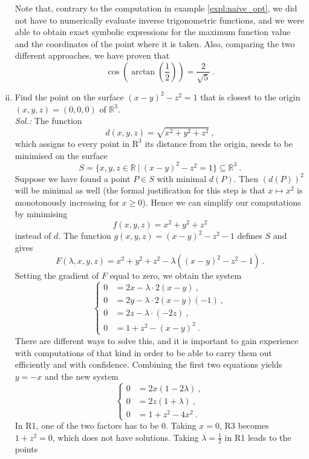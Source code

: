 \begin{example}
\begin{enumerate}[(i)]
	Note that, contrary to the computation in example \ref{expl:naive_opt}, we did not have to numerically evaluate inverse trigonometric functions, and we were able to obtain exact symbolic expressions for the maximum function value and the coordinates of the point where it is taken. Also, comparing the two different approaches, we have proven that
	\[ \cos \left( \arctan \left( \frac{1}{2}\right)\right) = \frac{2}{\sqrt{5}} \:. \]
	\item Find the point on the surface $(x-y)^2-z^2 = 1$ that is closest to the origin $(x,y,z)=(0,0,0)$ of $\mathbb{R}^3$.\\
	{\it Sol.:}
	The function
	\[ d(x,y,z) = \sqrt{x^2+y^2+z^2} \:, \]
	which assigns to every point in $\mathrm{R}^3$ its distance from the origin, needs to be minimised on the surface
	\[ S = \{ x,y,z\in \mathbb{R} \: | \: (x-y)^2-z^2 = 1\} \subseteq \mathbb{R}^3 \:. \]
	Suppose we have found a point $P \in S$ with minimal $d(P)$. Then $(d(P))^2$ will be minimal as well (the formal justification for this step is that $x \mapsto x^2$ is monotonously increasing for $x \geq 0$). Hence we can simplify our computations by minimising 
	\[ f(x,y,z) = x^2+y^2+z^2 \]
	instead of $d$. The function $g(x,y,z)=(x-y)^2-z^2-1$ defines $S$ and gives
	\[ F(\lambda,x,y,z) = x^2+y^2+z^2-\lambda((x-y)^2-z^2-1) \:. \]
	Setting the gradient of $F$ equal to zero, we obtain the system
	\begin{equation*}
		\begin{cases}
			0 &= 2x - \lambda \cdot 2(x-y) \:, \\
			0 &= 2y - \lambda \cdot 2(x-y)(-1) \:, \\
			0 &= 2z - \lambda \cdot (-2z) \:, \\
			0 &= 1+z^2-(x-y)^2 \:.
		\end{cases}
	\end{equation*}
	There are different ways to solve this, and it is important to gain experience with computations of that kind in order to be able to carry them out efficiently and with confidence. Combining the first two equations yields $y=-x$ and the new system
	\begin{equation*}
		\begin{cases}
			0 &= 2x (1 - 2 \lambda) \:, \\
			0 &= 2z (1 + \lambda) \:, \\
			0 &= 1 + z^2 - 4x^2 \:.
		\end{cases}
	\end{equation*}
	In R1, one of the two factors has to be $0$. Taking $x=0$, R3 becomes $1+z^2=0$, which does not have solutions. Taking $\lambda=\tfrac{1}{2}$ in R1 leads to the points

\end{enumerate}
\end{example}
